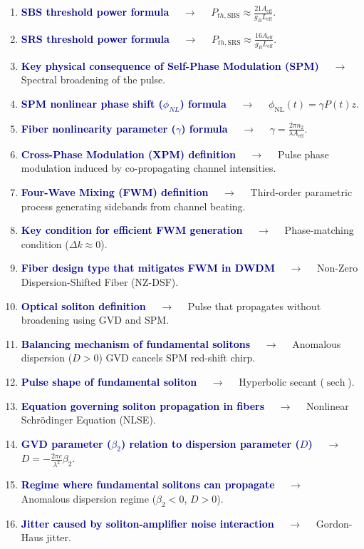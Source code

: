 \documentclass[11pt,a4paper]{article}
\begin{document}
\begin{enumerate}[label=\arabic*., leftmargin=*, labelsep=0.8em, itemsep=0.35em, parsep=0.1em, topsep=0.2em]
  \item \textcolor{darkblue}{\textbf{SBS threshold power formula}} $\quad\to\quad$ $P_{th,\text{SBS}} \approx \frac{21 A_{\text{eff}}}{g_B L_{\text{eff}}}$.
  \item \textcolor{darkblue}{\textbf{SRS threshold power formula}} $\quad\to\quad$ $P_{th,\text{SRS}} \approx \frac{16 A_{\text{eff}}}{g_R L_{\text{eff}}}$.
  \item \textcolor{darkblue}{\textbf{Key physical consequence of Self-Phase Modulation (SPM)}} $\quad\to\quad$ Spectral broadening of the pulse.
  \item \textcolor{darkblue}{\textbf{SPM nonlinear phase shift ($\phi_{NL}$) formula}} $\quad\to\quad$ $\phi_{\text{NL}}(t) = \gamma P(t) z$.
  \item \textcolor{darkblue}{\textbf{Fiber nonlinearity parameter ($\gamma$) formula}} $\quad\to\quad$ $\gamma = \frac{2\pi n_2}{\lambda A_{\text{eff}}}$.
  \item \textcolor{darkblue}{\textbf{Cross-Phase Modulation (XPM) definition}} $\quad\to\quad$ Pulse phase modulation induced by co-propagating channel intensities.
  \item \textcolor{darkblue}{\textbf{Four-Wave Mixing (FWM) definition}} $\quad\to\quad$ Third-order parametric process generating sidebands from channel beating.
  \item \textcolor{darkblue}{\textbf{Key condition for efficient FWM generation}} $\quad\to\quad$ Phase-matching condition ($\Delta k \approx 0$).
  \item \textcolor{darkblue}{\textbf{Fiber design type that mitigates FWM in DWDM}} $\quad\to\quad$ Non-Zero Dispersion-Shifted Fiber (NZ-DSF).
  \item \textcolor{darkblue}{\textbf{Optical soliton definition}} $\quad\to\quad$ Pulse that propagates without broadening using GVD and SPM.
  \item \textcolor{darkblue}{\textbf{Balancing mechanism of fundamental solitons}} $\quad\to\quad$ Anomalous dispersion ($D > 0$) GVD cancels SPM red-shift chirp.
  \item \textcolor{darkblue}{\textbf{Pulse shape of fundamental soliton}} $\quad\to\quad$ Hyperbolic secant ($\operatorname{sech}$).
  \item \textcolor{darkblue}{\textbf{Equation governing soliton propagation in fibers}} $\quad\to\quad$ Nonlinear Schrödinger Equation (NLSE).
  \item \textcolor{darkblue}{\textbf{GVD parameter ($\beta_2$) relation to dispersion parameter ($D$)}} $\quad\to\quad$ $D = -\frac{2\pi c}{\lambda^2} \beta_2$.
  \item \textcolor{darkblue}{\textbf{Regime where fundamental solitons can propagate}} $\quad\to\quad$ Anomalous dispersion regime ($\beta_2 < 0$, $D > 0$).
  \item \textcolor{darkblue}{\textbf{Jitter caused by soliton-amplifier noise interaction}} $\quad\to\quad$ Gordon-Haus jitter.
\end{enumerate}
\end{document}
